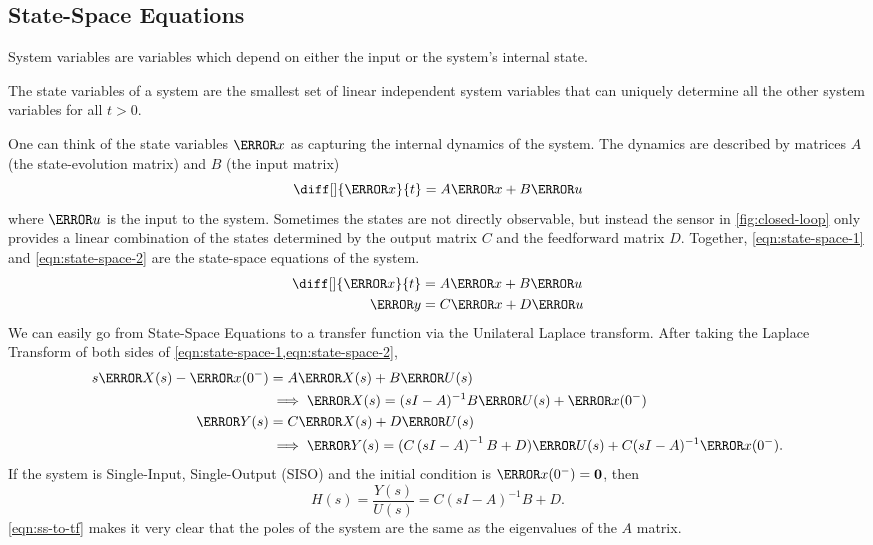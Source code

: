 \subsection{State-Space Equations}
\begin{definition}
  System variables are variables which depend on either the input or the system's internal state.
  \label{defn:system-vars}
\end{definition}
\begin{definition}
  The state variables of a system are the smallest set of linear independent system variables that can uniquely determine all the other system variables for all $t > 0$.
  \label{defn:state-vars}
\end{definition}
One can think of the state variables $\V{x}$ as capturing the internal dynamics of the system. The dynamics are described by matrices $A$ (the state-evolution matrix) and $B$ (the input matrix)
\[
  \diff[]{\V{x}}{t} = A\V{x} + B\V{u}
\]
where $\V{u}$ is the input to the system.
Sometimes the states are not directly observable, but instead the sensor in \cref{fig:closed-loop} only provides a linear combination of the states determined by the output matrix $C$ and the feedforward matrix $D$.
Together, \cref{eqn:state-space-1} and \cref{eqn:state-space-2} are the state-space equations of the system.
\begin{align}
  \diff[]{\V{x}}{t} &= A\V{x} + B\V{u} \label{eqn:state-space-1}\\
  \V{y} &= C\V{x} + D \V{u} \label{eqn:state-space-2}
\end{align}
We can easily go from State-Space Equations to a transfer function via the Unilateral Laplace transform. After taking the Laplace Transform of both sides of \cref{eqn:state-space-1,eqn:state-space-2},
\begin{align*}
  s\V{X}(s) - \V{x}(0^-) &= A\V{X}(s) + B\V{U}(s)\\
  &\implies \V{X}(s) = (sI-A)^{-1}B\V{U}(s) + \V{x}(0^{-})\\
  \V{Y}(s) &= C\V{X}(s) + D\V{U}(s)\\
  &\implies \V{Y}(s) = (C\left( sI-A \right)^{-1}B+D)\V{U}(s) + C(sI-A)^{-1}\V{x}(0^-).
\end{align*}
If the system is Single-Input, Single-Output (SISO) and the initial condition is $\V{x}(0^-) = \bs{0}$, then
\begin{equation}
  H(s) = \frac{Y(s)}{U(s)} = C(sI-A)^{-1}B+D.
  \label{eqn:ss-to-tf}
\end{equation}
\cref{eqn:ss-to-tf} makes it very clear that the poles of the system are the same as the eigenvalues of the $A$ matrix.
